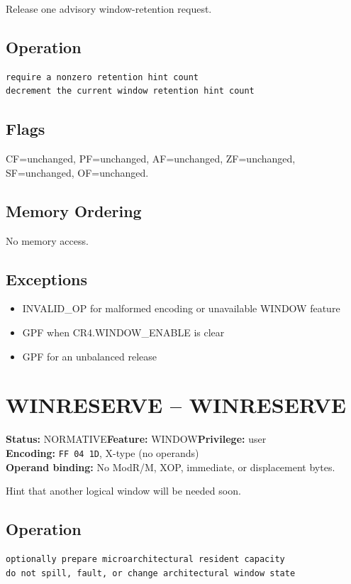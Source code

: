 \documentclass[10pt]{article}
\begin{document}
Release one advisory window-retention request.

\subsection*{Operation}
\begin{lstlisting}
require a nonzero retention hint count
decrement the current window retention hint count
\end{lstlisting}
\subsection*{Flags}
CF=unchanged, PF=unchanged, AF=unchanged, ZF=unchanged, SF=unchanged, OF=unchanged.
\subsection*{Memory Ordering}
No memory access.
\subsection*{Exceptions}
\begin{itemize}
\item INVALID\_OP for malformed encoding or unavailable WINDOW feature
\item GPF when CR4.WINDOW\_ENABLE is clear
\item GPF for an unbalanced release
\end{itemize}
\clearpage

\section{WINRESERVE -- WINRESERVE}
\textbf{Status:} NORMATIVE\quad \textbf{Feature:} WINDOW\quad \textbf{Privilege:} user\\
\textbf{Encoding:} \texttt{FF 04 1D}, X-type (no operands)\\
\textbf{Operand binding:} No ModR/M, XOP, immediate, or displacement bytes.

Hint that another logical window will be needed soon.

\subsection*{Operation}
\begin{lstlisting}
optionally prepare microarchitectural resident capacity
do not spill, fault, or change architectural window state
\end{lstlisting}
\end{document}
